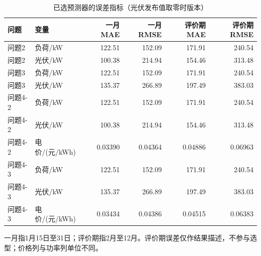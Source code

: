 \begin{table}[htbp]\centering\small
\caption{已选预测器的误差指标（光伏发布值取零时版本）}
\label{tab:v2_forecast_metrics}
\begin{tabularx}{\linewidth}{LLRRRR}\toprule
问题 & 变量 & 一月MAE & 一月RMSE & 评价期MAE & 评价期RMSE\\\midrule
问题2 & 负荷/kW & 122.51 & 152.09 & 171.91 & 240.54\\
问题2 & 光伏/kW & 100.38 & 214.94 & 154.46 & 313.48\\
问题3 & 负荷/kW & 122.51 & 152.09 & 171.91 & 240.54\\
问题3 & 光伏/kW & 135.37 & 266.89 & 197.49 & 383.03\\
问题4-2 & 负荷/kW & 122.51 & 152.09 & 171.91 & 240.54\\
问题4-2 & 光伏/kW & 100.38 & 214.94 & 154.46 & 313.48\\
问题4-2 & 电价/(元/kWh) & 0.03390 & 0.04364 & 0.04886 & 0.06963\\
问题4-3 & 负荷/kW & 122.51 & 152.09 & 171.91 & 240.54\\
问题4-3 & 光伏/kW & 135.37 & 266.89 & 197.49 & 383.03\\
问题4-3 & 电价/(元/kWh) & 0.03434 & 0.04386 & 0.04515 & 0.06383\\
\bottomrule\end{tabularx}
\par\smallskip\parbox{\linewidth}{\footnotesize 一月指1月15日至31日；评价期指2月至12月。评价期误差仅作结果描述，不参与选型；价格列与功率列单位不同。}
\end{table}